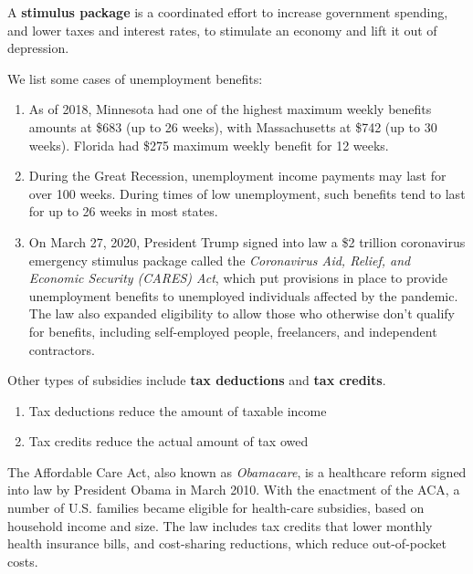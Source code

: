 \documentclass{article}
\begin{document}
  \begin{definition}
    \label{def:stimulus-package}
    A \textbf{stimulus package} is a coordinated effort to increase government spending, and lower taxes and interest rates, to stimulate an economy and lift it out of depression. 
  \end{definition}

  \begin{example}
    \label{ex:unemployment-benefits}
    We list some cases of unemployment benefits:
    \begin{enumerate}
      \item As of 2018, Minnesota had one of the highest maximum weekly benefits amounts at \$683 (up to 26 weeks), with Massachusetts at \$742 (up to 30 weeks). Florida had \$275 maximum weekly benefit for 12 weeks. 
      \item During the Great Recession, unemployment income payments may last for over 100 weeks. During times of low unemployment, such benefits tend to last for up to 26 weeks in most states. 
      \item On March 27, 2020, President Trump signed into law a \$2 trillion coronavirus emergency stimulus package called the \textit{Coronavirus Aid, Relief, and Economic Security (CARES) Act}, which put provisions in place to provide unemployment benefits to unemployed individuals affected by the pandemic. The law also expanded eligibility to allow those who otherwise don't qualify for benefits, including self-employed people, freelancers, and independent contractors. 
    \end{enumerate}
  \end{example}

  \begin{definition}
    \label{def:tax-deductions-credits}
    Other types of subsidies include \textbf{tax deductions} and \textbf{tax credits}. \begin{enumerate}
      \item Tax deductions reduce the amount of taxable income
      \item Tax credits reduce the actual amount of tax owed
    \end{enumerate}
  \end{definition}

  \begin{example}
    \label{ex:affordable-care-act}
    The Affordable Care Act, also known as \textit{Obamacare}, is a healthcare reform signed into law by President Obama in March 2010. With the enactment of the ACA, a number of U.S. families became eligible for health-care subsidies, based on household income and size.  The law includes tax credits that lower monthly health insurance bills, and cost-sharing reductions, which reduce out-of-pocket costs. 
  \end{example}
\end{document}
